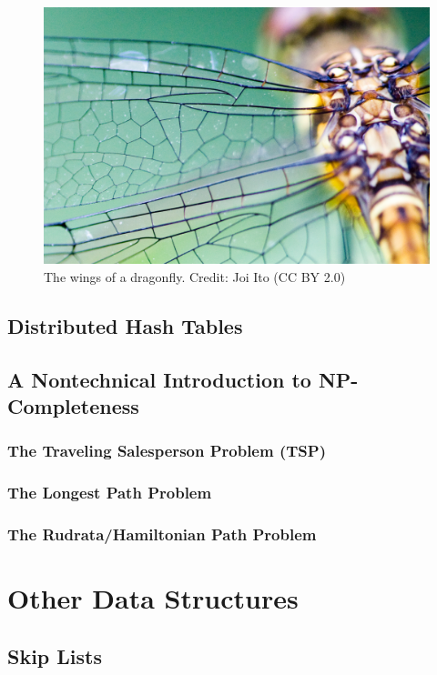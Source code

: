 \documentclass[10pt,a4paper]{book}
\begin{document}
\begin{figure}
	\centering
	\includegraphics[width=0.7\linewidth]{pics/dragonfly_wing_joi_ito}
	\caption{The wings of a dragonfly. Credit: Joi Ito (CC BY 2.0)}
	\label{fig:dragonflywingjoiito}
\end{figure}


\section{Distributed Hash Tables}





\section{A Nontechnical Introduction to NP-Completeness}

\subsection{The Traveling Salesperson Problem (TSP)}
\subsection{The Longest Path Problem}
\subsection{The Rudrata/Hamiltonian Path Problem}
\chapter{Other Data Structures}
\section{Skip Lists}
\end{document}

